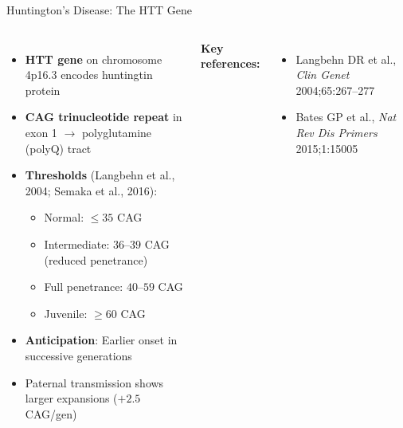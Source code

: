 \documentclass[aspectratio=169,11pt]{beamer}
\begin{document}
\begin{frame}{Huntington's Disease: The HTT Gene}
    \begin{columns}[T]
        \begin{itemize}
            \item \textbf{HTT gene} on chromosome 4p16.3 encodes huntingtin protein
            \item \textbf{CAG trinucleotide repeat} in exon 1 $\to$ polyglutamine (polyQ) tract
            \item \textbf{Thresholds} (Langbehn et al., 2004; Semaka et al., 2016):
            \begin{itemize}
                \item Normal: $\le 35$ CAG
                \item Intermediate: $36$--$39$ CAG (reduced penetrance)
                \item Full penetrance: $40$--$59$ CAG
                \item Juvenile: $\ge 60$ CAG
            \end{itemize}
            \item \textbf{Anticipation}: Earlier onset in successive generations
            \item Paternal transmission shows larger expansions ($+2.5$ CAG/gen)
        \end{itemize}


        \vspace{0.5cm}
        \textbf{Key references:}
        \begin{itemize}
            \item Langbehn DR et al., \textit{Clin Genet} 2004;65:267--277
            \item Bates GP et al., \textit{Nat Rev Dis Primers} 2015;1:15005
        \end{itemize}
    \end{columns}
\end{frame}
\end{document}
